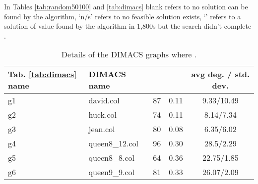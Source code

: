 \documentclass[10pt]{article}
\begin{document}
In Tables \ref{tab:random50100} and \ref{tab:dimacs} blank refers to no solution 
    can be found by the algorithm, `n/s' refers to no feasible solution exists, `' refers to a solution of value  found 
   by the algorithm in 1,800s but the search didn't complete .
   \begin{table}
  \small
  \centering
    \caption{Details of the DIMACS \cite{dimacs} graphs where .}
  \begin{tabular}{|l|l|c|c|c|} \hline
	Tab. \ref{tab:dimacs} name &DIMACS name&&&avg deg. / std. dev.\\ 
	\hline
	g1&david.col&87&0.11& 9.33/10.49\\
	\hline
	g2&huck.col&74&0.11& 8.14/7.34\\
	\hline
	g3&jean.col&80&0.08& 6.35/6.02\\
	\hline
	g4&queen8\_12.col&96&0.30& 28.5/2.29\\
	\hline
	g5&queen8\_8.col&64&0.36&22.75/1.85\\
	\hline
	g6&queen9\_9.col&81&0.33&26.07/2.09\\
	\hline
  \end{tabular}
    \label{tab:dimacs_set}
\end{table}
\end{document}
